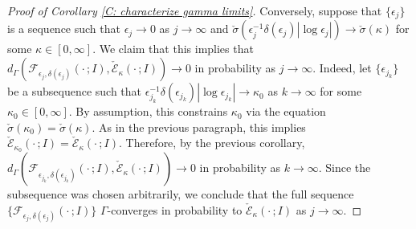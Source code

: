 \documentclass[12pt]{amsart}
\begin{document}
\begin{proof}[Proof of Corollary \ref{C: characterize gamma limits}]
Conversely, suppose that $\{\epsilon_{j}\}$ is a sequence such that $\epsilon_{j} \to 0$ as $j \to \infty$ and  $\check{\sigma}(\epsilon_{j}^{-1} \delta(\epsilon_{j}) | \log \epsilon_{j} | ) \to \check{\sigma}(\kappa)$ for some $\kappa \in [0,\infty]$.  We claim that this implies that $d_{\Gamma}( \mathscr{F}_{\epsilon_{j},\delta(\epsilon_{j})}( \cdot \, ; I ) , \check{\mathscr{E}}_{\kappa}(\cdot \, ; I ) ) \to 0$ in probability as $j \to \infty$.  Indeed, let $\{ \epsilon_{j_{k}} \}$ be a subsequence such that $\epsilon^{-1}_{j_{k}} \delta(\epsilon_{j_{k}}) | \log \epsilon_{j_{k}} | \to \kappa_{0}$ as $k \to \infty$ for some $\kappa_{0} \in [0,\infty]$.  By assumption, this constrains $\kappa_{0}$ via the equation $\check{\sigma}(\kappa_{0}) = \check{\sigma}(\kappa)$.  As in the previous paragraph, this implies $\check{\mathscr{E}}_{\kappa_{0}}(\cdot \, ; I ) = \check{\mathscr{E}}_{\kappa}( \cdot \, ; I )$.  Therefore, by the previous corollary, $d_{\Gamma}( \mathscr{F}_{\epsilon_{j_{k}},\delta(\epsilon_{j_{k}})} ( \cdot \, ; I ) , \check{\mathscr{E}}_{\kappa}( \cdot \, ; I ) ) \to 0$ in probability as $k \to \infty$.  Since the subsequence was chosen arbitrarily, we conclude that the full sequence $\{\mathscr{F}_{\epsilon_{j},\delta(\epsilon_{j})}(\cdot \, ; I ) \}$ $\Gamma$-converges in probability to $\check{\mathscr{E}}_{\kappa}(\cdot \, ; I )$ as $j \to \infty$.    \end{proof}
\end{document}
